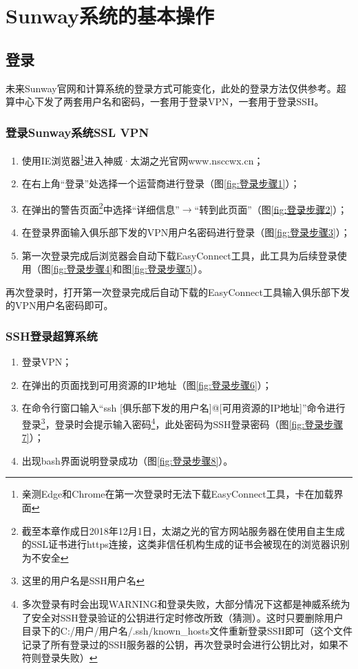 \chapter{Sunway系统的基本操作}\label{chap:introduction}

\section{登录}

未来Sunway官网和计算系统的登录方式可能变化，此处的登录方法仅供参考。超算中心下发了两套用户名和密码，一套用于登录VPN，一套用于登录SSH。

\subsection{登录Sunway系统SSL VPN}
\begin{enumerate}
    \item 使用IE浏览器\footnote{亲测Edge和Chrome在第一次登录时无法下载EasyConnect工具，卡在加载界面}进入神威·太湖之光官网www.nsccwx.cn；
    \item 在右上角“登录”处选择一个运营商进行登录（图\ref{fig:登录步骤1}）；
    \item 在弹出的警告页面\footnote{截至本章作成日2018年12月1日，太湖之光的官方网站服务器在使用自主生成的SSL证书进行https连接，这类非信任机构生成的证书会被现在的浏览器识别为不安全}中选择“详细信息”$\rightarrow$“转到此页面”（图\ref{fig:登录步骤2}）；
    \item 在登录界面输入俱乐部下发的VPN用户名密码进行登录（图\ref{fig:登录步骤3}）；
    \item 第一次登录完成后浏览器会自动下载EasyConnect工具，此工具为后续登录使用（图\ref{fig:登录步骤4}和图\ref{fig:登录步骤5}）。
\end{enumerate}

再次登录时，打开第一次登录完成后自动下载的EasyConnect工具输入俱乐部下发的VPN用户名密码即可。

\subsection{SSH登录超算系统}
\begin{enumerate}
    \item 登录VPN；
    \item 在弹出的页面找到可用资源的IP地址（图\ref{fig:登录步骤6}）；
    \item 在命令行窗口输入“ssh [俱乐部下发的用户名]@[可用资源的IP地址]”命令进行登录\footnote{这里的用户名是SSH用户名}，登录时会提示输入密码\footnote{多次登录有时会出现WARNING和登录失败，大部分情况下这都是神威系统为了安全对SSH登录验证的公钥进行定时修改所致（猜测）。这时只要删除用户目录下的C:/用户/用户名/.ssh/known\_hosts文件重新登录SSH即可（这个文件记录了所有登录过的SSH服务器的公钥，再次登录时会进行公钥比对，如果不符则登录失败）}，此处密码为SSH登录密码（图\ref{fig:登录步骤7}）；
    \item 出现bash界面说明登录成功（图\ref{fig:登录步骤8}）。
\end{enumerate}

